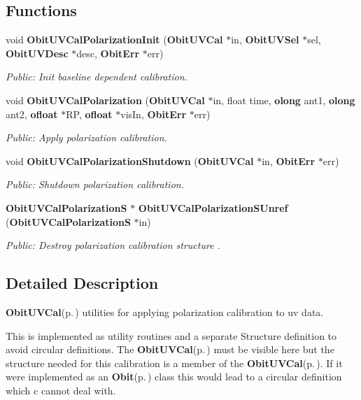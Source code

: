 \subsection*{Functions}
\begin{CompactItemize}
\item 
void {\bf Obit\-UVCal\-Polarization\-Init} ({\bf Obit\-UVCal} $\ast$in, {\bf Obit\-UVSel} $\ast$sel, {\bf Obit\-UVDesc} $\ast$desc, {\bf Obit\-Err} $\ast$err)
\begin{CompactList}\small\item\em Public: Init baseline dependent calibration. \item\end{CompactList}\item 
void {\bf Obit\-UVCal\-Polarization} ({\bf Obit\-UVCal} $\ast$in, float time, {\bf olong} ant1, {\bf olong} ant2, {\bf ofloat} $\ast$RP, {\bf ofloat} $\ast$vis\-In, {\bf Obit\-Err} $\ast$err)
\begin{CompactList}\small\item\em Public: Apply polarization calibration. \item\end{CompactList}\item 
void {\bf Obit\-UVCal\-Polarization\-Shutdown} ({\bf Obit\-UVCal} $\ast$in, {\bf Obit\-Err} $\ast$err)
\begin{CompactList}\small\item\em Public: Shutdown polarization calibration. \item\end{CompactList}\item 
{\bf Obit\-UVCal\-Polarization\-S} $\ast$ {\bf Obit\-UVCal\-Polarization\-SUnref} ({\bf Obit\-UVCal\-Polarization\-S} $\ast$in)
\begin{CompactList}\small\item\em Public: Destroy polarization calibration structure . \item\end{CompactList}\end{CompactItemize}


\subsection{Detailed Description}
{\bf Obit\-UVCal}{\rm (p.\,\pageref{structObitUVCal})} utilities for applying polarization calibration to uv data. 

This is implemented as utility routines and a separate Structure definition to avoid circular definitions. The {\bf Obit\-UVCal}{\rm (p.\,\pageref{structObitUVCal})} must be visible here but the structure needed for this calibration is a member of the {\bf Obit\-UVCal}{\rm (p.\,\pageref{structObitUVCal})}. If it were implemented as an {\bf Obit}{\rm (p.\,\pageref{structObit})} class this would lead to a circular definition which c cannot deal with.

